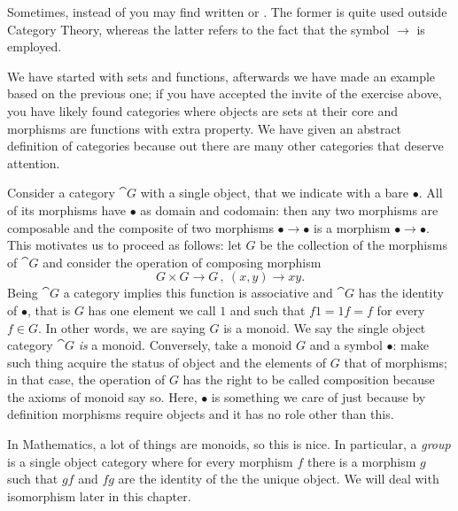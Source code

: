 Sometimes, instead of  you may find written  or . The former is quite used outside Category Theory, whereas the latter refers to the fact that the symbol \(\to\) is employed.

We have started with sets and functions, afterwards we have made an example based on the previous one; if you have accepted the invite of the exercise above, you have likely found categories where objects are sets at their core and morphisms are functions with extra property. We have given an abstract definition of categories because out there are many other categories that deserve attention.

\begin{example}
Consider a category \(\cat G\) with a single object, that we indicate with a bare \(\bullet\). All of its morphisms have \(\bullet\) as domain and codomain: then any two morphisms are composable and the composite of two morphisms \(\bullet \to \bullet\) is a morphism \(\bullet \to \bullet\). This motivates us to proceed as follows: let \(G\) be the collection of the morphisms of \(\cat G\) and consider the operation of composing morphism
\[G \times G \to G\,,\ (x, y) \to xy .\]
Being \(\cat G\) a category implies this function is associative and \(\cat G\) has the identity of \(\bullet\), that is \(G\) has one element we call \(1\) and such that \(f1 = 1f = f\) for every \(f \in G\). In other words, we are saying \(G\) is a monoid. We say the single object category \(\cat G\) {\em is} a monoid. \newline
Conversely, take a monoid \(G\) and a symbol \(\bullet\): make such thing acquire the status of object and the elements of \(G\) that of morphisms; in that case, the operation of \(G\) has the right to be called composition because the axioms of monoid say so. Here, \(\bullet\) is something we care of just because by definition morphisms require objects and it has no role other than this.
\end{example}

In Mathematics, a lot of things are monoids, so this is nice. In particular, a {\em group} is a single object category where for every morphism \(f\) there is a morphism \(g\) such that \(gf\) and \(fg\) are the identity of the the unique object. We will deal with isomorphism later in this chapter.


